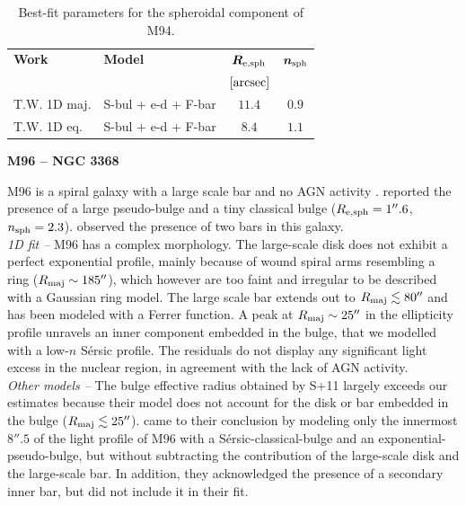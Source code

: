 \documentclass[preprint2]{emulateapj}
\begin{document}
  \begin{table}[h]
  \small
  \caption{Best-fit parameters for the spheroidal component of M94.}
  \begin{center}
  \begin{tabular}{llcc}
  \hline
  {\bf Work} & {\bf Model}   & $\bm R_{\rm e,sph}$    & $\bm n_{\rm sph}$ \\
    &  &  $[\rm arcsec]$ & \\
  \hline
  T.W. 1D maj. & S-bul + e-d + F-bar & $11.4$  &  $0.9$ \\
  T.W. 1D eq.  & S-bul + e-d + F-bar & $8.4$   &  $1.1$ \\
  \hline
  \end{tabular}
  \end{center}
  \label{tab:m94}
  \end{table}


  \clearpage\newpage\noindent
  {\bf M96 -- NGC 3368 \\}

  M96 is a spiral galaxy with a large scale bar and no AGN activity \citep{martini2003,nowak2010n3368n3489}. 
  \cite{nowak2010n3368n3489} reported the presence of a large pseudo-bulge and a tiny classical bulge 
  ($R_{\rm e, sph} = 1''.6$, $n_{\rm sph} = 2.3$). 
  \cite{erwin2004} observed the presence of two bars in this galaxy. \\

  \emph{1D fit -- }
  M96 has a complex morphology. 
  The large-scale disk does not exhibit a perfect exponential profile, 
  mainly because of wound spiral arms resembling a ring ($R_{\rm maj} \sim 185''$),
  which however are too faint and irregular to be described with a Gaussian ring model. 
  The large scale bar extends out to $R_{\rm maj} \lesssim 80''$ and has been modeled with a Ferrer function.
  A peak at $R_{\rm maj} \sim 25''$ in the ellipticity profile unravels an inner component embedded in the bulge, 
  that we modelled with a low-$n$ S\'ersic profile.
  The residuals do not display any significant light excess in the nuclear region, 
  in agreement with the lack of AGN activity.\\

  \emph{Other models -- } 
  The bulge effective radius obtained by S+11 largely exceeds our estimates 
  because their model does not account for the disk or bar embedded in the bulge ($R_{\rm maj} \lesssim 25''$). 
  \cite{nowak2010n3368n3489} came to their conclusion by modeling only the innermost $8''.5$ of the 
  light profile of M96 with a S\'ersic-classical-bulge and an exponential-pseudo-bulge, 
  but without subtracting the contribution of the large-scale disk and the large-scale bar.
  In addition, they acknowledged the presence of a secondary inner bar, but did not include it in their fit.\\
\end{document}
